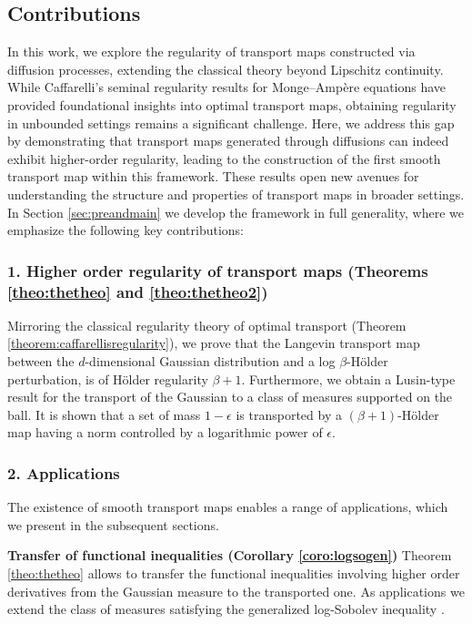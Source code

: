 \documentclass{article}
\begin{document}
\subsection{Contributions}
In this work, we explore the regularity of transport maps constructed via diffusion processes, extending the classical theory beyond Lipschitz continuity. While Caffarelli's seminal regularity results for Monge–Ampère equations have provided foundational insights into optimal transport maps, obtaining regularity in unbounded settings remains a significant challenge. Here, we address this gap by demonstrating that transport maps generated through diffusions can indeed exhibit higher-order regularity, leading to the construction of the first smooth transport map within this framework. These results open new avenues for understanding the structure and properties of transport maps in broader settings. In Section \ref{sec:preandmain} we develop the framework in full generality, where we emphasize
the following key contributions:
\subsubsection*{1. Higher order regularity of transport maps (Theorems \ref{theo:thetheo} and \ref{theo:thetheo2})}  Mirroring the classical regularity theory of optimal transport (Theorem \ref{theorem:caffarellisregularity}), we prove that the Langevin transport map between the $d$-dimensional Gaussian distribution and a log $\beta$-Hölder perturbation, is of Hölder regularity $\beta+1$. Furthermore, we obtain a Lusin-type result for the transport of the Gaussian to a class of measures supported on the ball. It is shown that a set of mass $1-\epsilon$ is transported by a $(\beta+1)$-Hölder map having a norm controlled by a logarithmic power of $\epsilon$.


\subsubsection*{2. Applications}
The existence of smooth transport maps enables a range of applications, which we present in the subsequent sections.


{\small\textbf{Transfer of functional inequalities (Corollary \ref{coro:logsogen}) } }Theorem \ref{theo:thetheo} allows to transfer the functional inequalities involving higher order derivatives from the Gaussian measure to the transported one. As applications we extend the class of measures satisfying the generalized log-Sobolev inequality \citep{rosen1976sobolev}.
\end{document}
